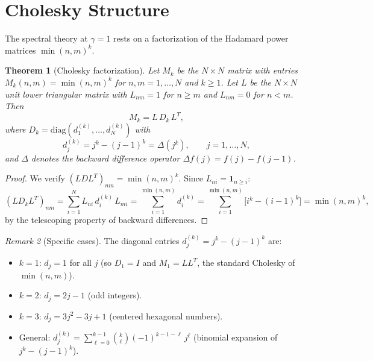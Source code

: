 \documentclass[11pt,a4paper]{article}
\theoremstyle{plain}
\newtheorem{theorem}{Theorem}[section]
\theoremstyle{definition}
\theoremstyle{remark}
\newtheorem{remark}[theorem]{Remark}
\begin{document}
\section{Cholesky Structure}\label{sec:cholesky}

The spectral theory at $\gamma = 1$ rests on a factorization of
the Hadamard power matrices $\min(n,m)^k$.

\begin{theorem}[Cholesky factorization]\label{thm:cholesky}
Let $M_k$ be the $N \times N$ matrix with entries
$M_k(n,m) = \min(n,m)^k$ for $n,m = 1,\ldots,N$
and $k \geq 1$. Let $L$ be the $N \times N$ unit lower
triangular matrix with $L_{nm} = 1$ for $n \geq m$ and
$L_{nm} = 0$ for $n < m$. Then
\begin{equation}\label{eq:cholesky}
  M_k = L\,D_k\,L^T,
\end{equation}
where $D_k = \mathrm{diag}(d_1^{(k)},\ldots,d_N^{(k)})$ with
\begin{equation}\label{eq:dk}
  d_j^{(k)} = j^k - (j-1)^k = \Delta(j^k),
  \qquad j = 1,\ldots,N,
\end{equation}
and $\Delta$ denotes the backward difference operator
$\Delta f(j) = f(j) - f(j-1)$.
\end{theorem}

\begin{proof}
We verify $(LDL^T)_{nm} = \min(n,m)^k$.
Since $L_{ni} = \mathbf{1}_{n \geq i}$:
\[
  (L D_k L^T)_{nm}
  = \sum_{i=1}^N L_{ni}\,d_i^{(k)}\,L_{mi}
  = \sum_{i=1}^{\min(n,m)} d_i^{(k)}
  = \sum_{i=1}^{\min(n,m)} \bigl[i^k - (i-1)^k\bigr]
  = \min(n,m)^k,
\]
by the telescoping property of backward differences.
\end{proof}

\begin{remark}[Specific cases]\label{rem:Dk-cases}
The diagonal entries $d_j^{(k)} = j^k - (j-1)^k$ are:
\begin{itemize}[nosep]
\item $k = 1$: $d_j = 1$ for all $j$
  (so $D_1 = I$ and $M_1 = LL^T$,
   the standard Cholesky of $\min(n,m)$).
\item $k = 2$: $d_j = 2j - 1$ (odd integers).
\item $k = 3$: $d_j = 3j^2 - 3j + 1$
  (centered hexagonal numbers).
\item General: $d_j^{(k)} = \sum_{\ell=0}^{k-1}
  \binom{k}{\ell}(-1)^{k-1-\ell}\,j^\ell$
  (binomial expansion of $j^k - (j-1)^k$).
\end{itemize}
\end{remark}
\end{document}
